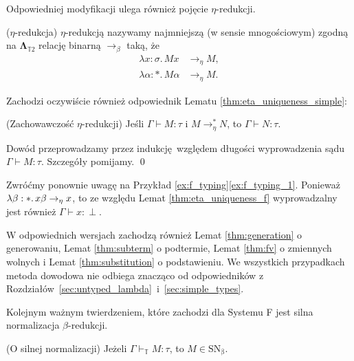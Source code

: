 Odpowiedniej modyfikacji ulega również pojęcie \(\eta\)-redukcji.
  \begin{definicja}(\(\eta\)-redukcja)
    \(\eta\)-redukcją nazywamy najmniejszą (w sensie mnogościowym) zgodną na \(\mathbf{\Lambda}_{\mathbb{T}2}\) relację binarną \(\to_\beta\) taką, że
  \begin{align*}
    \lambda x:\sigma.\,Mx &\to_\eta M,\\
    \lambda \alpha:*.\,M\alpha &\to_\eta M.
  \end{align*}
  \end{definicja}

Zachodzi oczywiście również odpowiednik Lematu \ref{thm:eta_uniqueness_simple}:
\begin{lemat}(Zachowawczość \(\eta\)-redukcji)\label{thm:eta_uniqueness_f}
  Jeśli \(\Gamma\vdash M:\tau\) i \(M\to^{*}_\eta N\), to \(\Gamma\vdash N:\tau\).
\end{lemat}
\begin{dowod}
  Dowód przeprowadzamy przez indukcję względem długości wyprowadzenia sądu \(\Gamma\vdash M:\tau\). Szczegóły pomijamy. \qed
\end{dowod}

\begin{przyklad} Zwróćmy ponownie uwagę na Przykład \ref{ex:f_typing}\ref{ex:f_typing_1}. Ponieważ \(\lambda \beta : *.\,x\beta\nobreak\to_\eta\nobreak x\), to ze względu Lemat \ref{thm:eta_uniqueness_f} wyprowadzalny jest również \(\Gamma\vdash x:\perp\).
\end{przyklad}

W odpowiednich wersjach zachodzą również Lemat \ref{thm:generation} o generowaniu, Lemat \ref{thm:subterm} o podtermie, Lemat \ref{thm:fv} o zmiennych wolnych i Lemat \ref{thm:substitution} o podstawieniu. We wszystkich przypadkach metoda dowodowa nie odbiega znacząco od odpowiedników z Rozdziałów~\ref{sec:untyped_lambda}~i~\ref{sec:simple_types}.

Kolejnym ważnym twierdzeniem, które zachodzi dla Systemu F jest silna normalizacja \(\beta\)-redukcji.

\begin{twierdzenie}(O silnej normalizacji)
  Jeżeli \(\Gamma\vdash_\mathbb{T}M:\tau\), to \(M\in\mathrm{SN_\beta}\).
\end{twierdzenie}
\begin{dowod}

\end{dowod}

